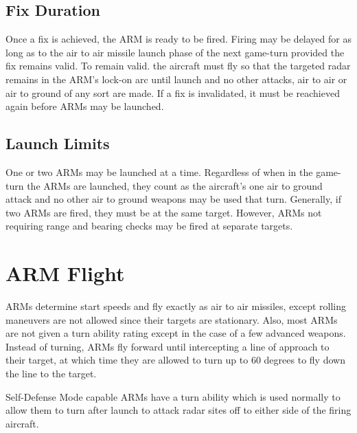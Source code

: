 
\subsection{Fix Duration} Once a fix is achieved, the ARM is ready to be fired. Firing may be delayed for as long as to the air to air missile launch phase of the next game-turn provided the fix remains valid. To remain valid. the aircraft must fly so that the targeted radar remains in the ARM's lock-on arc until launch and no other attacks, air to air or air to ground of any sort are made. If a fix is invalidated, it must be reachieved again before ARMs may be launched.

\subsection{Launch Limits} One or two ARMs may be launched at a time.  Regardless of when in the game-turn the ARMs are launched, they count as the aircraft's one air to ground attack and no other air to ground weapons may be used that turn. Generally, if two ARMs are fired, they must be at the same target. However, ARMs not requiring range and bearing checks may be fired at separate targets.

\section{ARM Flight}

ARMs determine start speeds and fly exactly as air to air missiles, except rolling maneuvers are not allowed since their targets are stationary. Also, most ARMs are not given a turn ability rating except in the case of a few advanced weapons. Instead of turning, ARMs fly forward until intercepting a line of approach to their target, at which time they are allowed to turn up to 60 degrees to fly down the line to the target. 

Self-Defense Mode capable ARMs have a turn ability which is used normally to allow them to turn after launch to attack radar sites off to either side of the firing aircraft.

